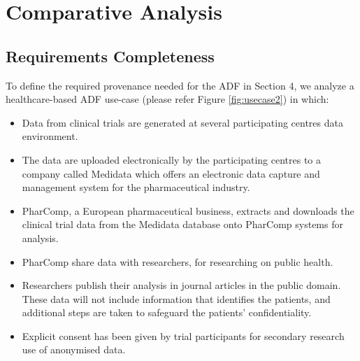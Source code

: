 \section{Comparative Analysis} \label{sec:analysis}

\subsection{Requirements Completeness}

To define the required provenance needed for the ADF in Section 4,  we analyze a healthcare-based ADF use-case (please refer Figure \ref{fig:usecase2})  in which:
\begin{itemize}
\item Data from clinical trials are generated at several participating centres data environment.
\item The data are uploaded electronically by the participating centres to a company called Medidata which offers an electronic data capture and management system for the pharmaceutical industry. 
\item PharComp, a European pharmaceutical business, extracts and downloads the clinical trial data from the Medidata database onto PharComp systems for analysis. 
\item PharComp share data with researchers, for researching on public health. 
\item Researchers publish their analysis in journal articles in the public domain. These data will not include information that identifies the patients, and additional steps are taken to safeguard the patients’ confidentiality.
\item  Explicit consent has been given by trial participants for secondary research use of anonymised data.
\end{itemize}




